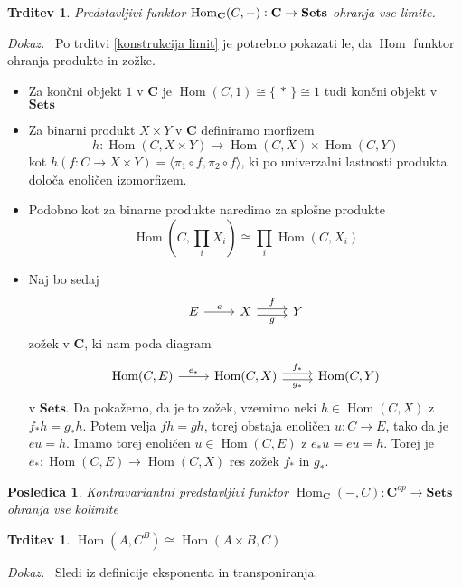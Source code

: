 \documentclass[12pt,a4paper]{book}
\theoremstyle{definition}
\theoremstyle{plain}
\newtheorem{trditev}[definicija]{Trditev}
\newtheorem{posledica}{Posledica}[definicija]
\newenvironment{dokaz}{\emph{Dokaz.}\ }{\hspace{\fill}{$\Box$}}
\theoremstyle{definition}
\theoremstyle{remark}
\newcommand{\cat}[1]{\textbf{#1}}
\DeclareMathOperator{\Hom}{Hom}
\renewcommand{\set}[1]{\{\,#1\,\}}
\begin{document}
 
\begin{trditev} Predstavljivi funktor $\Hom_{\bf{C}}(C,-): \bf{C} \to \bf{Sets}$ ohranja vse limite.
\end{trditev}
\begin{dokaz}
Po trditvi \ref{konstrukcija limit} je potrebno pokazati le, da $\Hom$ funktor ohranja produkte in zožke. 

\begin{itemize}
\item Za končni objekt $1$ v $\cat{C}$ je $\Hom(C,1) \cong \set{*} \cong 1$ tudi končni objekt v $\cat{Sets}$
\item Za binarni produkt $X \times Y$ v $\cat{C}$ definiramo morfizem 
$$h : \Hom(C, X \times Y) \to \Hom(C,X) \times \Hom(C,Y)$$
kot $h(f : C \to X \times Y) = \langle \pi_1 \circ f, \pi_2 \circ f \rangle$, ki po univerzalni lastnosti produkta določa enoličen izomorfizem.
\item Podobno kot za binarne produkte naredimo za splošne produkte
$$\Hom(C, \prod_i X_i) \cong \prod_i \Hom(C, X_i)$$
\item Naj bo sedaj
$$ \begin{tikzcd}[sep=normal]
E \ar[r, "e"] & X \ar[r, shift left, "f"] \ar[r, shift right, "g"'] & Y
\end{tikzcd} $$
zožek v $\cat{C}$, ki nam poda diagram
$$ \begin{tikzcd}[sep=normal]
\Hom(C,E) \ar[r, "e_*"] & \Hom(C,X) \ar[r, shift left, "f_*"] \ar[r, shift right, "g_*"'] & \Hom(C,Y)
\end{tikzcd} $$
v $\cat{Sets}$. Da pokažemo, da je to zožek, vzemimo neki $h \in \Hom(C,X)$ z $f_* h = g_* h$. Potem velja $fh = gh$, torej obstaja enoličen $u : C \to E$, tako da je $eu = h$. Imamo torej enoličen $u \in \Hom(C,E)$ z $e_* u = eu = h$. Torej je $e_* : \Hom(C,E) \to \Hom(C,X)$ res zožek $f_*$ in $g_*$.
\end{itemize}

\end{dokaz}

\begin{posledica}
Kontravariantni predstavljivi funktor $\Hom_\cat{C}(-,C) : \cat{C}^{op} \to \cat{Sets}$ ohranja vse kolimite
\end{posledica}

\begin{trditev}
$\Hom(A, C^B) \cong \Hom(A \times B, C)$
\end{trditev}
\begin{dokaz}
Sledi iz definicije eksponenta in transponiranja.
\end{dokaz}
\end{document}
